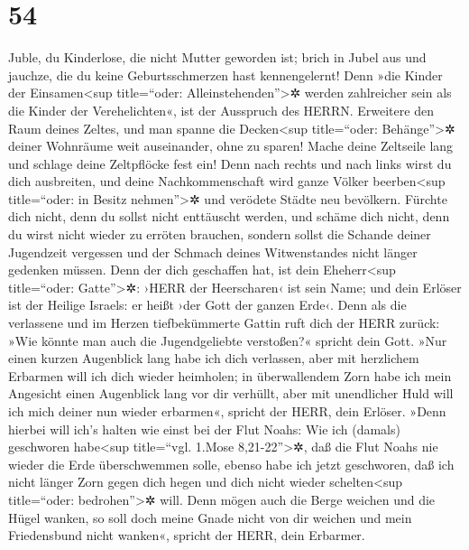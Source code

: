 \hypertarget{section-53}{%
\section{54}\label{section-53}}

Juble, du Kinderlose, die nicht Mutter geworden ist; brich
in Jubel aus und jauchze, die du keine Geburtsschmerzen hast
kennengelernt! Denn »die Kinder der Einsamen\textless sup title=``oder:
Alleinstehenden''\textgreater✲ werden zahlreicher sein als die Kinder
der Verehelichten«, ist der Ausspruch des HERRN. Erweitere
den Raum deines Zeltes, und man spanne die Decken\textless sup
title=``oder: Behänge''\textgreater✲ deiner Wohnräume weit auseinander,
ohne zu sparen! Mache deine Zeltseile lang und schlage deine Zeltpflöcke
fest ein! Denn nach rechts und nach links wirst du dich
ausbreiten, und deine Nachkommenschaft wird ganze Völker
beerben\textless sup title=``oder: in Besitz nehmen''\textgreater✲ und
verödete Städte neu bevölkern. Fürchte dich nicht, denn du
sollst nicht enttäuscht werden, und schäme dich nicht, denn du wirst
nicht wieder zu erröten brauchen, sondern sollst die Schande deiner
Jugendzeit vergessen und der Schmach deines Witwenstandes nicht länger
gedenken müssen. Denn der dich geschaffen hat, ist dein
Eheherr\textless sup title=``oder: Gatte''\textgreater✲: ›HERR der
Heerscharen‹ ist sein Name; und dein Erlöser ist der Heilige Israels: er
heißt ›der Gott der ganzen Erde‹. Denn als die verlassene
und im Herzen tiefbekümmerte Gattin ruft dich der HERR zurück: »Wie
könnte man auch die Jugendgeliebte verstoßen?« spricht dein Gott.
»Nur einen kurzen Augenblick lang habe ich dich verlassen,
aber mit herzlichem Erbarmen will ich dich wieder heimholen;
in überwallendem Zorn habe ich mein Angesicht einen
Augenblick lang vor dir verhüllt, aber mit unendlicher Huld will ich
mich deiner nun wieder erbarmen«, spricht der HERR, dein Erlöser.
»Denn hierbei will ich's halten wie einst bei der Flut
Noahs: Wie ich (damals) geschworen habe\textless sup title=``vgl. 1.Mose
8,21-22''\textgreater✲, daß die Flut Noahs nie wieder die Erde
überschwemmen solle, ebenso habe ich jetzt geschworen, daß ich nicht
länger Zorn gegen dich hegen und dich nicht wieder schelten\textless sup
title=``oder: bedrohen''\textgreater✲ will. Denn mögen
auch die Berge weichen und die Hügel wanken, so soll doch meine Gnade
nicht von dir weichen und mein Friedensbund nicht wanken«, spricht der
HERR, dein Erbarmer.


